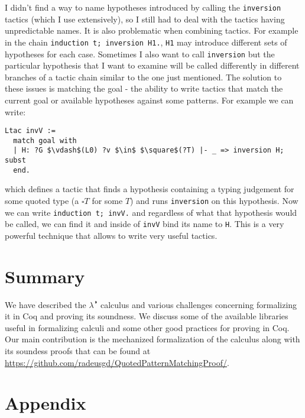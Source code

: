 \documentclass[runningheads]{article}
\begin{document}
I didn't find a way to name hypotheses introduced by calling the \verb|inversion| tactics (which I use extensively), so I still had to deal with the tactics having unpredictable names. It is also problematic when combining tactics. For example in the chain \verb|induction t; inversion H1.|, \verb|H1| may introduce different sets of hypotheses for each case. Sometimes I also want to call \verb|inversion| but the particular hypothesis that I want to examine will be called differently in different branches of a tactic chain similar to the one just mentioned. The solution to these issues is matching the goal - the ability to write tactics that match the current goal or available hypotheses against some patterns. For example we can write:
\begin{lstlisting}[mathescape=true]
Ltac invV :=
  match goal with
  | H: ?G $\vdash$(L0) ?v $\in$ $\square$(?T) |- _ => inversion H; subst
  end.
\end{lstlisting}
which defines a tactic that finds a hypothesis containing a typing judgement for some quoted type (a $\square T$ for some $T$) and runs \verb|inversion| on this hypothesis. Now we can write \verb|induction t; invV.| and regardless of what that hypothesis would be called, we can find it and inside of \verb|invV| bind its name to \verb|H|. This is a very powerful technique that allows to write very useful tactics.


\section{Summary}

We have described the $\lambda^{\RIGHTcircle}$ calculus and various challenges concerning formalizing it in Coq and proving its soundness. We discuss some of the available libraries useful in formalizing calculi and some other good practices for proving in Coq. Our main contribution is the mechanized formalization of the calculus along with its soundess proofs that can be found at \href{https://github.com/radeusgd/QuotedPatternMatchingProof/}{https://github.com/radeusgd/QuotedPatternMatchingProof/}.





\section*{Appendix}

\end{document}
